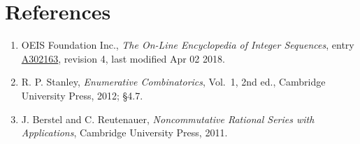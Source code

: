 \documentclass[11pt]{article}
\theoremstyle{definition}
\begin{document}
\section{References}

\begin{enumerate}

\item OEIS Foundation Inc., \emph{The On-Line Encyclopedia of Integer Sequences}, entry \href{https://oeis.org/A302163}{A302163}, revision 4, last modified Apr 02 2018.

\item R. P. Stanley, \emph{Enumerative Combinatorics}, Vol.~1, 2nd ed., Cambridge University Press, 2012; \S4.7.

\item J. Berstel and C. Reutenauer, \emph{Noncommutative Rational Series with Applications}, Cambridge University Press, 2011.

\end{enumerate}
\end{document}
